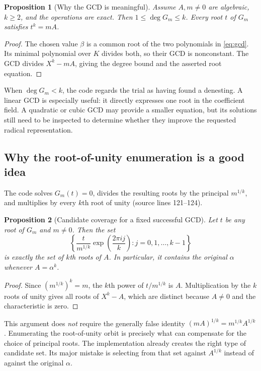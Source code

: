 \documentclass[11pt,letterpaper]{article}
\newcommand{\src}[1]{\textnormal{(source lines #1)}}
\newtheorem{proposition}{Proposition}[section]
\theoremstyle{definition}
\begin{document}
\begin{proposition}[Why the GCD is meaningful]
Assume $A,m\ne0$ are algebraic, $k\ge2$, and the operations are exact. Then
$1\le\deg G_m\le k$. Every root $t$ of $G_m$ satisfies $t^k=mA$.
\end{proposition}
\begin{proof}
The chosen value $\beta$ is a common root of the two polynomials in
\eqref{eq:gcd}. Its minimal polynomial over $K$ divides both, so their GCD is
nonconstant. The GCD divides $X^k-mA$, giving the degree bound and the asserted
root equation.
\end{proof}

When $\deg G_m<k$, the code regards the trial as having found a denesting. A
linear GCD is especially useful: it directly expresses one root in the coefficient
field. A quadratic or cubic GCD may provide a smaller equation, but its solutions
still need to be inspected to determine whether they improve the requested
radical representation.

\subsection{Why the root-of-unity enumeration is a good idea}
The code solves $G_m(t)=0$, divides the resulting roots by the principal
$m^{1/k}$, and multiplies by every $k$th root of unity \src{121--124}.

\begin{proposition}[Candidate coverage for a fixed successful GCD]
Let $t$ be any root of $G_m$ and $m\ne0$. Then the set
\begin{equation}\label{eq:orbit}
 \left\{\frac{t}{m^{1/k}}\exp\!\left(\frac{2\pi i j}{k}\right):
 j=0,1,\ldots,k-1\right\}
\end{equation}
is exactly the set of $k$th roots of $A$. In particular, it contains the original
$\alpha$ whenever $A=\alpha^k$.
\end{proposition}
\begin{proof}
Since $(m^{1/k})^k=m$, the $k$th power of $t/m^{1/k}$ is $A$. Multiplication by
the $k$ roots of unity gives all roots of $X^k-A$, which are distinct because
$A\ne0$ and the characteristic is zero.
\end{proof}

This argument does \emph{not} require the generally false identity
$(mA)^{1/k}=m^{1/k}A^{1/k}$. Enumerating the root-of-unity orbit is precisely what
can compensate for the choice of principal roots. The implementation already
creates the right type of candidate set. Its major mistake is selecting from
that set against $A^{1/k}$ instead of against the original $\alpha$.
\end{document}
